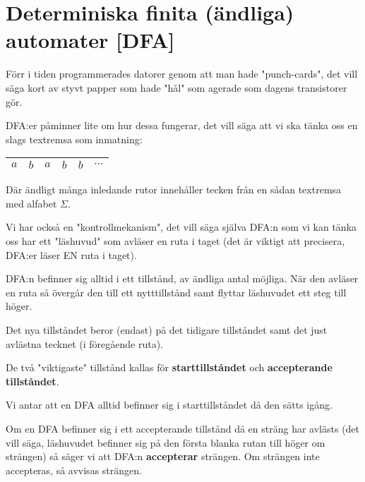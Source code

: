 \section{Determiniska finita (ändliga) automater [DFA]}
\par\bigskip
\noindent Förr i tiden programmerades datorer genom att man hade "punch-cards", det vill säga kort av styvt papper som hade "hål" som agerade som dagens transistorer gör.\par
\noindent DFA:er påminner lite om hur dessa fungerar, det vill säga att vi ska tänka oss en slags textremsa som inmatning:
\begin{center}
  \begin{tabular}{|c|c|c|c|c|c|}
    \hline
    $a$&$b$&$a$&$b$&$b$&$\cdots$\\
    \hline
  \end{tabular}
\end{center}
\par\bigskip
\noindent Där ändligt många inledande rutor innehåller tecken från en sådan textremsa med alfabet $\Sigma$.
\par\bigskip
\noindent Vi har också en "kontrollmekanism", det vill säga själva DFA:n som vi kan tänka oss har ett "läshuvud" som avläser en ruta i taget (det är viktigt att precisera, DFA:er läser EN ruta i taget).\par
\noindent DFA:n befinner sig alltid i ett tillstånd, av ändliga antal möjliga. När den avläser en ruta så övergår den till ett nytttillstånd samt flyttar läshuvudet ett steg till höger.\par
\noindent Det nya tillståndet beror (endast) på det tidigare tillståndet samt det just avlästna tecknet (i föregående ruta).
\par\bigskip
\noindent De två "viktigaste" tillstånd kallas för \textbf{starttillståndet} och \textbf{accepterande tillståndet}.\par
\noindent Vi antar att en DFA alltid befinner sig i starttillståndet då den sätts igång.\par
\noindent Om en DFA befinner sig i ett accepterande tillstånd då en sträng har avlästs (det vill säga, läshuvudet befinner sig på den första blanka rutan till höger om strängen) så säger vi att DFA:n \textbf{accepterar }strängen. Om strängen inte accepteras, så avvisas strängen. 
\par\bigskip
